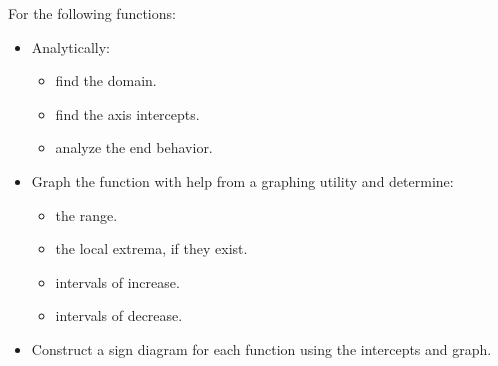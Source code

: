 \begin{ex}  For the following functions:

\begin{itemize}

\item Analytically:

\begin{multicols}{3}

\begin{itemize}

\item find the domain.

\item find the axis intercepts.

\item analyze the end behavior.

\end{itemize}

\end{multicols}


\item Graph the function with help from a graphing utility and determine:

\begin{multicols}{2}

\begin{itemize}

\item  the range.

\item the local extrema, if they exist.

\end{itemize}

\end{multicols}

\begin{multicols}{2}

\begin{itemize}

\item intervals of increase.

\item intervals of decrease.

\end{itemize}

\end{multicols}

\item Construct a sign diagram for each function using the intercepts and graph.


\end{itemize}
\end{ex}

